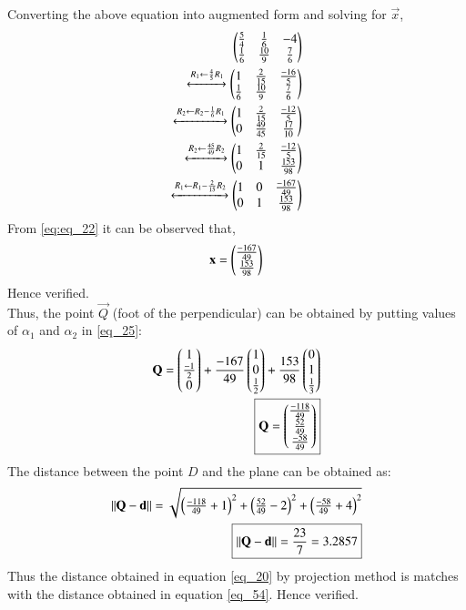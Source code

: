 \documentclass[journal,12pt,twocolumn]{IEEEtran}
\begin{document}
Converting the above equation into augmented form and solving for $\vec{x}$,
\begin{align}
    \begin{pmatrix}\frac{5}{4} & \frac{1}{6} & -4\\ \frac{1}{6} & \frac{10}{9} &\frac{7}{6}\end{pmatrix}\nonumber\\ 
    \xleftrightarrow[]{R_1 \leftarrow \frac{4}{5}R_1} 
    \begin{pmatrix}1 & \frac{2}{15} & \frac{-16}{5} \\ \frac{1}{6} & \frac{10}{9} & \frac{7}{6}\end{pmatrix} \nonumber \\ 
    \xleftrightarrow[]{R_2 \leftarrow R_2-\frac{1}{6}R_1} \begin{pmatrix}1 & \frac{2}{15} & \frac{-12}{5} \\ 0 & \frac{49}{45} & \frac{17}{10}\end{pmatrix}\nonumber\\
    \xleftrightarrow[]{R_2 \leftarrow \frac{45}{49}R_2} \begin{pmatrix}1 & \frac{2}{15} & \frac{-12}{5} \\ 0 & 1 & \frac{153}{98}\end{pmatrix}\nonumber\\
    \xleftrightarrow[]{R_1 \leftarrow R_1-\frac{2}{15}R_2} \begin{pmatrix}1 & 0 & \frac{-167}{49} \\ 0 & 1 & \frac{153}{98}\end{pmatrix}\label{eq:eq_22}
\end{align}
From \eqref{eq:eq_22} it can be observed that,
\begin{align} 
    \mathbf{x} = \begin{pmatrix}\frac{-167}{49} \\ \frac{153}{98}\end{pmatrix} 
\end{align}
Hence verified.\\
Thus, the point $\vec{Q}$ (foot of the perpendicular) can be obtained by putting values of $\alpha_1$ and $\alpha_2$ in \eqref{eq_25}:
\begin{align}
    \mathbf{Q} = \begin{pmatrix}1\\\frac{-1}{2}\\0\end{pmatrix} + \frac{-167}{49}\begin{pmatrix}1\\0\\\frac{1}{2}\end{pmatrix} +  \frac{153}{98}\begin{pmatrix}0\\1\\\frac{1}{3}\end{pmatrix}\\
    \boxed{\mathbf{Q} = \begin{pmatrix}\tfrac{-118}{49}\\\tfrac{52}{49}\\\tfrac{-58}{49}\end{pmatrix}}
\end{align}
The distance between the point $D$ and the plane can be obtained as:
\begin{align}
    \left\lVert\mathbf{Q}-\mathbf{d}\right\rVert=\sqrt{\left(\tfrac{-118}{49}+1\right)^2+\left(\tfrac{52}{49}-2\right)^2+\left(\tfrac{-58}{49}+4\right)^2}\\
    \boxed{\left\lVert\mathbf{Q}-\mathbf{d}\right\rVert=\frac{23}{7}=3.2857} \label{eq_54}
\end{align}
Thus the distance obtained in equation \eqref{eq_20} by projection method is matches with the distance obtained in equation \eqref{eq_54}. Hence verified.
\end{document}
